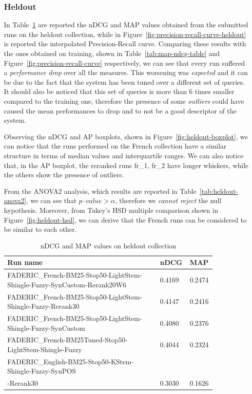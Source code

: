 \subsubsection{Heldout}
\label{subsubsec:heldout-res}

In Table~\ref{tab:heldout-map-ndcg-table} are reported the \ac{nDCG} and \ac{MAP} values obtained from the submitted runs on the heldout collection, while in Figure~\ref{fig:precision-recall-curve-heldout} is reported the interpolated Precision-Recall curve. Comparing these results with the ones obtained on training, shown in Table~\ref{tab:map-ndcg-table} and Figure~\ref{fig:precision-recall-curve} respectively, we can see that every run suffered a \emph{performance drop} over all the measures. This worsening was \emph{expected} and it can be due to the fact that the system has been tuned over a different set of queries. It should also be noticed that this set of queries is more than 6 times smaller compared to the training one, therefore the presence of some \emph{outliers} could have caused the mean performances to drop and to not be a good descriptor of the system.

Observing the \ac{nDCG} and \ac{AP} boxplots, shown in Figure~\ref{fig:heldout-boxplot}, we can notice that the runs performed on the French collection have a similar structure in terms of median values and interquartile ranges. We can also notice that, in the \ac{AP} boxplot, the reranked runs fr\_1, fr\_2 have longer whiskers, while the others show the presence of outliers.

From the ANOVA2 analysis, which results are reported in Table~\ref{tab:heldout-anova2}, we can see that $p\textrm{--}value>\alpha$, therefore we \emph{cannot reject} the null hypothesis. Moreover, from Tukey's \ac{HSD} multiple comparison shown in Figure~\ref{fig:heldout-hsd}, we can derive that the French runs can be considered to be similar to each other.

\begin{table}[tbp]
\caption{\ac{nDCG} and \ac{MAP} values on heldout collection}
  \label{tab:heldout-map-ndcg-table}
    \centering
    \begin{tabular}{|p{0.7\linewidth}|p{0.075\linewidth}|p{0.075\linewidth}|}
	\toprule
	\textbf{Run name} & \textbf{nDCG} & \textbf{MAP} \\
	\midrule
        FADERIC\_French-BM25-Stop50-LightStem-Shingle-Fuzzy-SynCustom-Rerank20W6 & 0.4169 & 0.2474 \\
        FADERIC\_French-BM25-Stop50-LightStem-Shingle-Fuzzy-Rerank30 & 0.4147 & 0.2416 \\
        FADERIC\_French-BM25-Stop50-LightStem-Shingle-Fuzzy-SynCustom & 0.4080 & 0.2376 \\
        FADERIC\_French-BM25Tuned-Stop50-LightStem-Shingle-Fuzzy & 0.4044 & 0.2324 \\
        FADERIC\_English-BM25-Stop50-KStem-Shingle-Fuzzy-SynPOS\\-Rerank30 & 0.3030 & 0.1626 \\
	\bottomrule
    \end{tabular}
\end{table}

